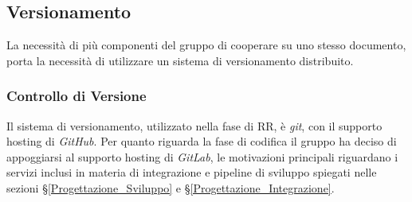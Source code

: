 

\subsection{Versionamento}\label{ProcessiSupporto_Versionamento}
La necessità di più componenti del gruppo di cooperare su uno stesso documento, porta la necessità di utilizzare un sistema di versionamento distribuito. 



\subsubsection{Controllo di Versione}
Il sistema di versionamento, utilizzato nella fase di RR, è \textit{git}, con il supporto hosting di \textit{GitHub}. Per quanto riguarda la fase di codifica il gruppo ha deciso di appoggiarsi al supporto hosting di \textit{GitLab}, le motivazioni principali riguardano i servizi inclusi in materia di integrazione e pipeline di sviluppo spiegati nelle sezioni §\ref{Progettazione_Sviluppo} e §\ref{Progettazione_Integrazione}.


